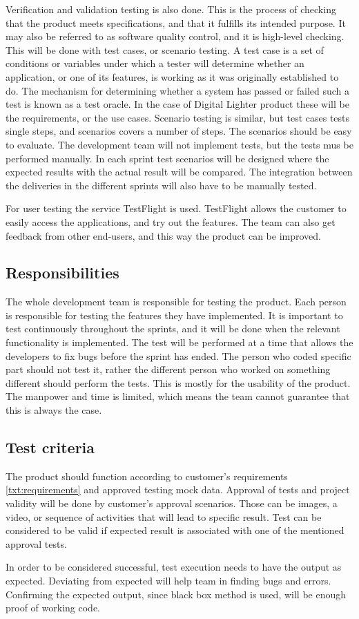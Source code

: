 Verification and validation testing is also done. 
This is the process of checking that the product meets specifications, and that it fulfills its intended purpose. It may also be referred to as software quality control, and it is high-level checking. 
This will be done with test cases, or scenario testing. 
A test case is a set of conditions or variables under which a tester will determine whether an application, or one of its features, is working as it was originally established to do. 
The mechanism for determining whether a system has passed or failed such a test is known as a test oracle. 
In the case of Digital Lighter product these will be the requirements, or the use cases. Scenario testing is similar, but test cases tests single steps, and scenarios covers a number of steps. 
The scenarios should be easy to evaluate. 
The development team will not implement tests, but the tests  mus be performed manually. 
In each sprint test scenarios will be designed where the expected results with the actual result will be compared.
The integration between the deliveries in the different sprints will also have to be manually tested. 

For user testing the service TestFlight is used. TestFlight allows the customer to easily access the applications, and try out the features. The team can also get feedback from other end-users, and this way the product can be improved.  


\subsection{Responsibilities}
The whole development team is responsible for testing the product. 
Each person is responsible for testing the features they have implemented. It is important to test continuously throughout the sprints, and it will be done when the relevant functionality is implemented. The test will be performed at a time that allows the developers to fix bugs before the sprint has ended.
The person who coded specific part should not test it, rather the different person who worked on something different should perform the tests. 
This is mostly for the usability of the product. The manpower and time is limited, which means the team cannot guarantee that this is always the case.
 

\subsection{Test criteria} 

The product should function according to customer's requirements \ref{txt:requirements} and approved testing mock data.
Approval of tests and project validity will be done by customer's approval scenarios. 
Those can be images, a video, or sequence of activities that will lead to specific result. 
Test can be considered to be valid if expected result is associated with one of the mentioned approval tests.

In order to be considered successful, test execution needs to have the output as expected. 
Deviating from expected will help team in finding bugs and errors.
Confirming the expected output, since black box method is used, will be enough proof of working code.
